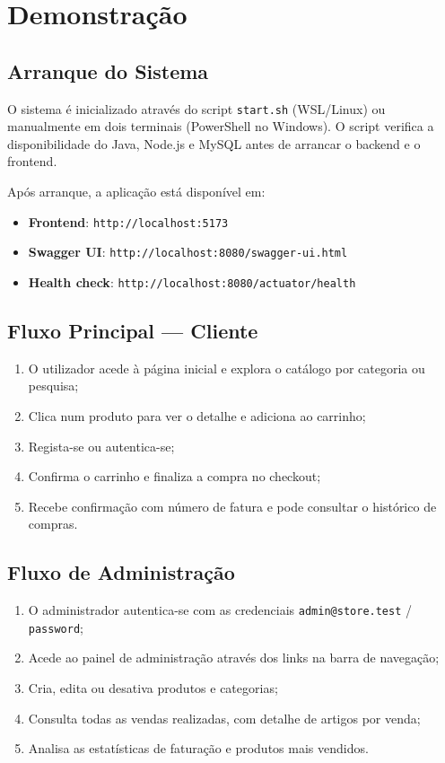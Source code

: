 \section{Demonstração}
\label{sec:demo}

\subsection{Arranque do Sistema}

O sistema é inicializado através do script \texttt{start.sh} (WSL/Linux) ou manualmente em dois terminais (PowerShell no Windows). O script verifica a disponibilidade do Java, Node.js e MySQL antes de arrancar o backend e o frontend.

Após arranque, a aplicação está disponível em:
\begin{itemize}
    \item \textbf{Frontend}: \texttt{http://localhost:5173}
    \item \textbf{Swagger UI}: \texttt{http://localhost:8080/swagger-ui.html}
    \item \textbf{Health check}: \texttt{http://localhost:8080/actuator/health}
\end{itemize}

\subsection{Fluxo Principal — Cliente}

\begin{enumerate}
    \item O utilizador acede à página inicial e explora o catálogo por categoria ou pesquisa;
    \item Clica num produto para ver o detalhe e adiciona ao carrinho;
    \item Regista-se ou autentica-se;
    \item Confirma o carrinho e finaliza a compra no checkout;
    \item Recebe confirmação com número de fatura e pode consultar o histórico de compras.
\end{enumerate}

\subsection{Fluxo de Administração}

\begin{enumerate}
    \item O administrador autentica-se com as credenciais \texttt{admin@store.test} / \texttt{password};
    \item Acede ao painel de administração através dos links na barra de navegação;
    \item Cria, edita ou desativa produtos e categorias;
    \item Consulta todas as vendas realizadas, com detalhe de artigos por venda;
    \item Analisa as estatísticas de faturação e produtos mais vendidos.
\end{enumerate}

